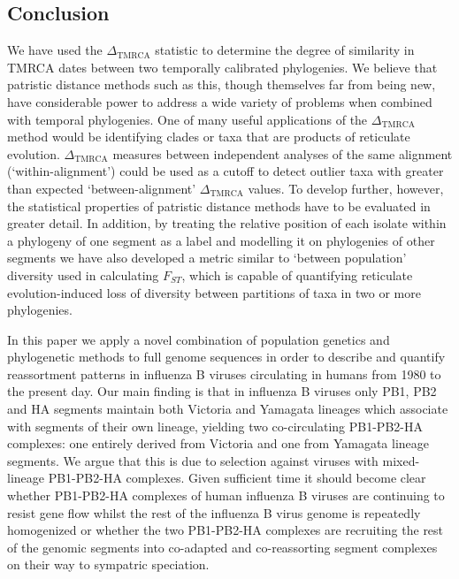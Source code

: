 \documentclass[11pt,oneside,letterpaper]{article}
\newcommand{\dtmrca}{\Delta_\mathrm{TMRCA}}
\begin{document}
\subsection*{Conclusion}
We have used the $\dtmrca$ statistic to determine the degree of similarity in TMRCA dates between two temporally calibrated phylogenies.
We believe that patristic distance methods such as this, though themselves far from being new, have considerable power to address a wide variety of problems when combined with temporal phylogenies.
One of many useful applications of the $\dtmrca$ method would be identifying clades or taxa that are products of reticulate evolution.
$\dtmrca$ measures between independent analyses of the same alignment (`within-alignment') could be used as a cutoff to detect outlier taxa with greater than expected `between-alignment' $\dtmrca$ values.
To develop further, however, the statistical properties of patristic distance methods have to be evaluated in greater detail.
In addition, by treating the relative position of each isolate within a phylogeny of one segment as a label and modelling it on phylogenies of other segments we have also developed a metric similar to `between population' diversity used in calculating $F_{ST}$, which is capable of quantifying reticulate evolution-induced loss of diversity between partitions of taxa in two or more phylogenies.

In this paper we apply a novel combination of population genetics and phylogenetic methods to full genome sequences in order to describe and quantify reassortment patterns in influenza B viruses circulating in humans from 1980 to the present day.
Our main finding is that in influenza B viruses only PB1, PB2 and HA segments maintain both Victoria and Yamagata lineages which associate with segments of their own lineage, yielding two co-circulating PB1-PB2-HA complexes: one entirely derived from Victoria and one from Yamagata lineage segments.
We argue that this is due to selection against viruses with mixed-lineage PB1-PB2-HA complexes.
Given sufficient time it should become clear whether PB1-PB2-HA complexes of human influenza B viruses are continuing to resist gene flow whilst the rest of the influenza B virus genome is repeatedly homogenized or whether the two PB1-PB2-HA complexes are recruiting the rest of the genomic segments into co-adapted and co-reassorting segment complexes on their way to sympatric speciation.

\newpage
\end{document}
